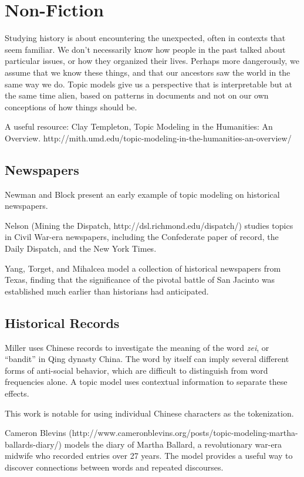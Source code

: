 
\chapter{Non-Fiction}
\label{ch:nonfiction}

Studying history is about encountering the unexpected, often in contexts that seem familiar. We don't necessarily know how people in the past talked about particular issues, or how they organized their lives. Perhaps more dangerously, we assume that we know these things, and that our ancestors saw the world in the same way we do. Topic models give us a perspective that is interpretable but at the same time alien, based on patterns in documents and not on our own conceptions of how things should be.

A useful resource:
Clay Templeton, Topic Modeling in the Humanities: An Overview.
http://mith.umd.edu/topic-modeling-in-the-humanities-an-overview/

\section{Newspapers}

Newman and Block \cite{newman-06} present an early example of topic modeling on historical newspapers.

Nelson (Mining the Dispatch, http://dsl.richmond.edu/dispatch/) studies topics in Civil War-era newspapers, including the Confederate paper of record, the Daily Dispatch, and the New York Times.

Yang, Torget, and Mihalcea \cite{yang-11-historical} model a collection of historical newspapers from Texas, finding that the significance of the pivotal battle of San Jacinto was established much earlier than historians had anticipated.

\section{Historical Records}

Miller \cite{miller-13} uses Chinese records to investigate the meaning of the word {\em zei}, or ``bandit'' in Qing dynasty China. The word by itself can imply several different forms of anti-social behavior, which are difficult to distinguish from word frequencies alone. A topic model uses contextual information to separate these effects.

This work is notable for using individual Chinese characters as the tokenization.

Cameron Blevins (http://www.cameronblevins.org/posts/topic-modeling-martha-ballards-diary/) models the diary of Martha Ballard, a revolutionary war-era midwife who recorded entries over 27 years. The model provides a useful way to discover connections between words and repeated discourses.

